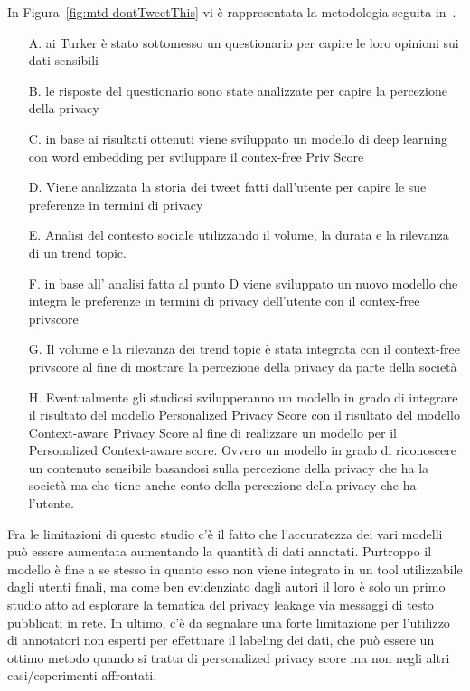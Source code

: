 In Figura~\ref{fig:mtd-dontTweetThis} vi è rappresentata la metodologia seguita in~\cite{dontTweetThis}.

\begin{enumerate}
\item [A.]ai Turker è stato sottomesso un questionario per capire le loro opinioni sui dati sensibili
\item [B.]le risposte del questionario sono state analizzate per capire la percezione della privacy
\item [C.]in base ai risultati ottenuti viene sviluppato un modello di deep learning con word embedding per sviluppare il contex-free Priv Score
\item [D.]Viene analizzata la storia dei tweet fatti dall’utente per capire le sue preferenze in termini di privacy
\item [E.]Analisi del contesto sociale utilizzando il volume, la durata e la rilevanza di un trend topic. 
\item [F.]in base all' analisi fatta al punto D viene sviluppato un nuovo modello che integra le preferenze in termini di privacy dell'utente con il contex-free privscore
\item [G.]Il volume e la rilevanza dei trend topic è stata integrata con il context-free privscore al fine di mostrare la percezione della privacy da parte della società
\item [H.]Eventualmente gli studiosi svilupperanno un modello in grado di integrare il risultato del modello Personalized Privacy Score con il risultato del modello Context-aware Privacy Score al fine di realizzare un modello per il Personalized Context-aware score. Ovvero un modello in grado di riconoscere un contenuto sensibile basandosi sulla percezione della privacy che ha la società ma che tiene anche conto della percezione della privacy che ha l'utente.
\end{enumerate}
Fra le limitazioni di questo studio c'è il fatto che l'accuratezza dei vari modelli può essere aumentata aumentando la quantità di dati annotati. Purtroppo il modello è fine a se stesso in quanto esso non viene integrato in un tool utilizzabile dagli utenti finali, ma come ben evidenziato dagli autori il loro è solo un primo studio atto ad esplorare la tematica del privacy leakage via messaggi di testo pubblicati in rete. In ultimo, c'è da segnalare una forte limitazione per l'utilizzo di annotatori non esperti per effettuare il labeling dei dati, che può essere un ottimo metodo quando si tratta di personalized privacy score ma non negli altri casi/esperimenti affrontati.


